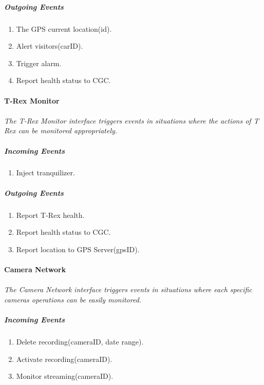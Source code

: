 \documentclass[12pt]{article}
\begin{document}
	    \subparagraph{Outgoing Events}
		\begin{enumerate}
		    \item The GPS current location(id).
		    \item Alert visitors(carID).
		    \item Trigger alarm.
		    \item Report health status to CGC.
		\end{enumerate}

    \paragraph{T-Rex Monitor}
	\paragraph{}\textit{The T-Rex Monitor interface triggers events in situations where the actions of T Rex can be monitored appropriately. }
	    \subparagraph{Incoming Events}
		\begin{enumerate}
			\item Inject tranquilizer. 
		\end{enumerate}
				
	    \subparagraph{Outgoing Events}
		\begin{enumerate}
			\item Report T-Rex health.
			\item Report health status to CGC.
			\item Report location to GPS Server(gpsID).
		\end{enumerate}

	\paragraph{Camera Network}
	\paragraph{}\textit{The Camera Network interface triggers events in situations where each specific cameras operations can be easily monitored. }
	    \subparagraph{Incoming Events}
		\begin{enumerate}
			\item Delete recording(cameraID, date range).
			\item Activate recording(cameraID).
			\item Monitor streaming(cameraID).
		\end{enumerate}
		
\end{document}
